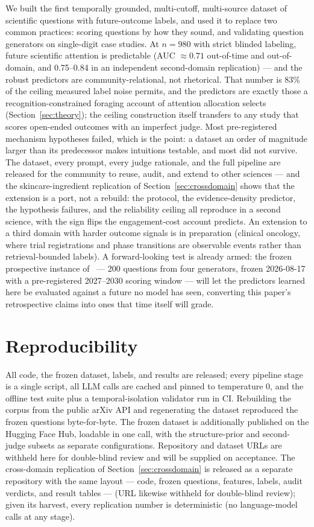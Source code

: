 \documentclass[11pt]{article}
\begin{document}
We built the first temporally grounded, multi-cutoff, multi-source
dataset of scientific questions with future-outcome labels, and used it
to replace two common practices: scoring questions by how they sound,
and validating question generators on single-digit case studies. At
$n=980$ with strict blinded labeling, future scientific attention is
predictable (AUC $\approx 0.71$ out-of-time and out-of-domain, and
0.75--0.84 in an independent second-domain replication) --- and
the robust predictors are community-relational, not rhetorical. That
number is 83\% of the ceiling measured label noise permits, and the
predictors are exactly those a recognition-constrained foraging account
of attention allocation selects (Section~\ref{sec:theory}); the
ceiling construction itself transfers to any study that scores
open-ended outcomes with an imperfect judge. Most
pre-registered mechanism hypotheses failed, which is the point: a
dataset an order of magnitude larger than its predecessor makes
intuitions testable, and most did not survive. The dataset, every
prompt, every judge rationale, and the full pipeline are released for
the community to reuse, audit, and extend to other sciences --- and the
skincare-ingredient replication of Section~\ref{sec:crossdomain} shows
that the extension is a port, not a rebuild: the protocol, the
evidence-density predictor, the hypothesis failures, and the
reliability ceiling all reproduce in a second science, with the sign
flips the engagement-cost account predicts. An extension to a third
domain with harder outcome signals is in preparation (clinical
oncology, where trial registrations and phase transitions are
observable events rather than retrieval-bounded labels). A
forward-looking test is already armed: the frozen prospective
instance of~\cite{paper2} --- 200 questions from four generators, frozen 2026-08-17 with
a pre-registered 2027--2030 scoring window --- will let the predictors
learned here be evaluated against a future no model has seen,
converting this paper's retrospective claims into ones that time itself
will grade.

\section*{Reproducibility}

All code, the frozen dataset, labels, and results are released; every
pipeline stage is a single script, all LLM calls are cached and pinned
to temperature 0, and the offline test suite plus a temporal-isolation
validator run in CI. Rebuilding the corpus from the public arXiv API and
regenerating the dataset reproduced the frozen questions byte-for-byte.
The frozen dataset is additionally published on the Hugging Face Hub,
loadable in one call, with the structure-prior and second-judge subsets as
separate configurations. Repository and dataset URLs are withheld here for
double-blind review and will be supplied on acceptance.
The cross-domain replication of Section~\ref{sec:crossdomain} is
released as a separate repository with the same layout --- code, frozen
questions, features, labels, audit verdicts, and result tables ---
(URL likewise withheld for double-blind review); given its harvest, every
replication number is deterministic (no language-model calls at any stage).
\end{document}
